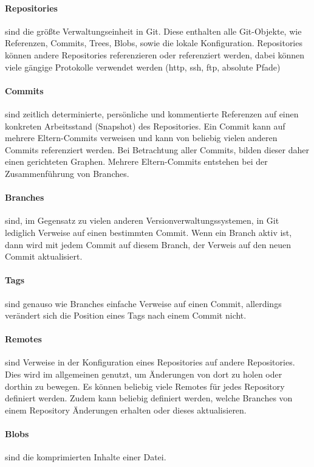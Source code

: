 \paragraph{Repositories} sind die größte Verwaltungseinheit in Git. Diese enthalten alle Git-Objekte, wie Referenzen, 
Commits, Trees, Blobs, sowie die lokale Konfiguration. Repositories können andere Repositories referenzieren oder 
referenziert werden, dabei können viele gängige Protokolle verwendet werden (http, ssh, ftp, absolute Pfade)

\paragraph{Commits} sind zeitlich determinierte, persönliche und kommentierte Referenzen auf einen konkreten Arbeitsstand 
(\glqq Snapshot\grqq{}) des Repositories. Ein Commit kann auf mehrere Eltern-Commits verweisen und kann von beliebig vielen
anderen Commits referenziert werden. Bei Betrachtung aller Commits, bilden dieser daher einen gerichteten Graphen. 
Mehrere Eltern-Commits entstehen bei der Zusammenführung von Branches.

\paragraph{Branches} sind, im Gegensatz zu vielen anderen Versionverwaltungssystemen, in Git lediglich Verweise auf einen 
bestimmten Commit. Wenn ein Branch aktiv ist, dann wird mit jedem Commit auf diesem Branch, der Verweis auf den neuen 
Commit aktualisiert.

\paragraph{Tags} sind genauso wie Branches einfache Verweise auf einen Commit, allerdings verändert sich die Position 
eines Tags nach einem Commit nicht.

\paragraph{Remotes} sind Verweise in der Konfiguration eines Repositories auf andere Repositories. Dies wird im 
allgemeinen genutzt, um Änderungen von dort zu holen oder dorthin zu bewegen. Es können beliebig viele Remotes für jedes 
Repository definiert werden. Zudem kann beliebig definiert werden, welche Branches von einem Repository Änderungen 
erhalten oder dieses aktualisieren.

\paragraph{Blobs} sind die komprimierten Inhalte einer Datei.

